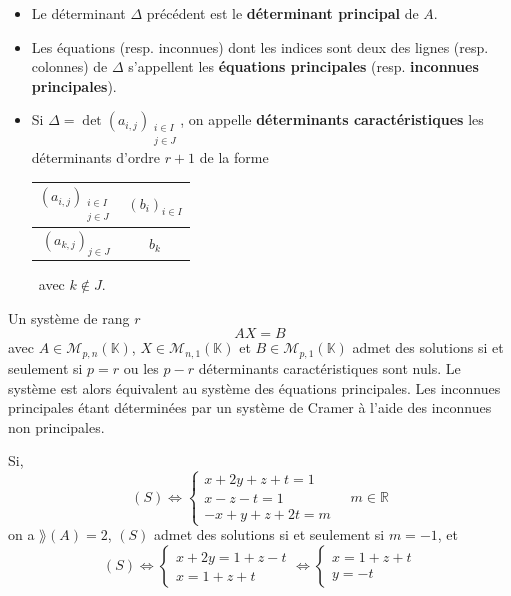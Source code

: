   \begin{definition}
    \begin{itemize}
      \item Le déterminant $\Delta$ précédent est le \textbf{déterminant principal} de $A$.
      \item Les équations (resp. inconnues) dont les indices sont deux des lignes (resp. colonnes) de $\Delta$ s'appellent les \textbf{équations principales} (resp. \textbf{inconnues principales}).
      \item Si $\Delta = \det(a_{i,j})_{\substack{i \in I \\ j \in J}}$, on appelle \textbf{déterminants caractéristiques} les déterminants d'ordre $r+1$ de la forme
      \begin{center}
        \begin{tabular}{|c|c|}
          $(a_{i,j})_{\substack{i \in I \\ j \in J}}$ & $(b_i)_{i \in I}$ \\
          \hline
          $(a_{k,j})_{j \in J}$ & $b_k$
        \end{tabular}
        \, avec $k \notin J$.
      \end{center}
    \end{itemize}
  \end{definition}

  \begin{theorem}
    Un système de rang $r$
    \[ AX = B \]
    avec $A \in \mathcal{M}_{p,n}(\mathbb{K})$, $X \in \mathcal{M}_{n,1}(\mathbb{K})$ et $B \in \mathcal{M}_{p,1}(\mathbb{K})$ admet des solutions si et seulement si $p = r$ ou les $p-r$ déterminants caractéristiques sont nuls. Le système est alors équivalent au système des équations principales. Les inconnues principales étant déterminées par un système de Cramer à l'aide des inconnues non principales.
  \end{theorem}

  \begin{example}
    Si,
    \[
    (S) \iff
    \begin{cases}
      x + 2y + z + t = 1 \\
      x - z - t = 1 \\
      -x + y + z + 2t = m
    \end{cases}
    \quad
    m \in \mathbb{R}
    \]
    on a $\rang(A) = 2$, $(S)$ admet des solutions si et seulement si $m=-1$, et
    \[
    (S)
    \iff \begin{cases}
      x + 2y = 1 + z - t \\
      x = 1 + z + t
    \end{cases}
    \iff \begin{cases}
      x = 1 + z + t \\
      y = -t
    \end{cases}
    \]
  \end{example}

